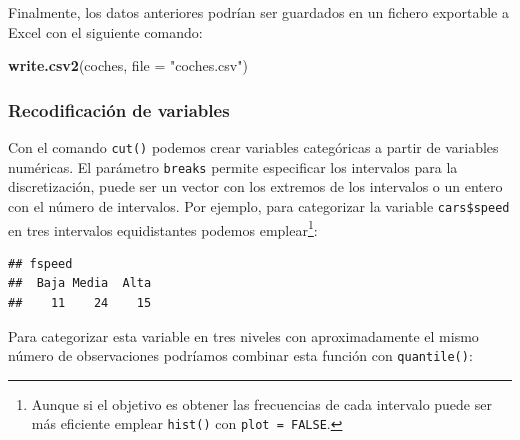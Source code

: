 \documentclass[
]{book}
\newenvironment{Shaded}{\begin{snugshade}}{\end{snugshade}}
\newcommand{\AttributeTok}[1]{\textcolor[rgb]{0.13,0.29,0.53}{#1}}
\newcommand{\DecValTok}[1]{\textcolor[rgb]{0.00,0.00,0.81}{#1}}
\newcommand{\FunctionTok}[1]{\textcolor[rgb]{0.13,0.29,0.53}{\textbf{#1}}}
\newcommand{\NormalTok}[1]{#1}
\newcommand{\OtherTok}[1]{\textcolor[rgb]{0.56,0.35,0.01}{#1}}
\newcommand{\SpecialCharTok}[1]{\textcolor[rgb]{0.81,0.36,0.00}{\textbf{#1}}}
\newcommand{\StringTok}[1]{\textcolor[rgb]{0.31,0.60,0.02}{#1}}
\begin{document}
Finalmente, los datos anteriores podrían ser guardados en un fichero
exportable a Excel con el siguiente comando:

\begin{Shaded}
\begin{Highlighting}[]
\FunctionTok{write.csv2}\NormalTok{(coches, }\AttributeTok{file =} \StringTok{"coches.csv"}\NormalTok{)}
\end{Highlighting}
\end{Shaded}

\hypertarget{recodificaciuxf3n-de-variables}{%
\subsubsection{Recodificación de variables}\label{recodificaciuxf3n-de-variables}}

Con el comando \texttt{cut()} podemos crear variables categóricas a partir de variables numéricas.
El parámetro \texttt{breaks} permite especificar los intervalos para la discretización, puede ser un vector con los extremos de los intervalos o un entero con el número de intervalos.
Por ejemplo, para categorizar la variable \texttt{cars\$speed} en tres intervalos equidistantes podemos emplear\footnote{Aunque si el objetivo es obtener las frecuencias de cada intervalo puede ser más eficiente emplear \texttt{hist()} con \texttt{plot\ =\ FALSE}.}:

\begin{Shaded}
\end{Shaded}

\begin{verbatim}
## fspeed
##  Baja Media  Alta 
##    11    24    15
\end{verbatim}

Para categorizar esta variable en tres niveles con aproximadamente el mismo número de observaciones podríamos combinar esta función con \texttt{quantile()}:

\begin{Shaded}
\end{Shaded}
\end{document}
